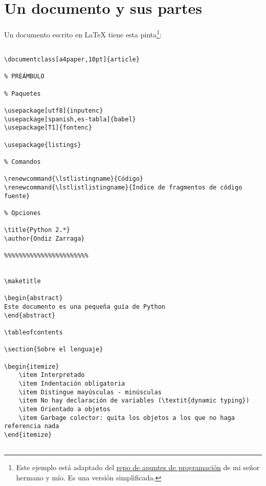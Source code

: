 \section{Un documento y sus partes}\label{un-documento-y-sus-partes}

Un documento escrito en LaTeX tiene esta pinta\footnote{Este ejemplo
  está adaptado del
  \href{https://github.com/ekaitz-zarraga/programming-notes}{repo de
  apuntes de programación} de mi señor hermano y mío. Es una versión
  simplificada.}:

\begin{lstlisting}[language={[latex]tex}, caption={Ejemplo de documento escrito con \LaTeX}]

\documentclass[a4paper,10pt]{article}

% PREÁMBULO 

% Paquetes

\usepackage[utf8]{inputenc}
\usepackage[spanish,es-tabla]{babel}
\usepackage[T1]{fontenc}

\usepackage{listings}

% Comandos

\renewcommand{\lstlistingname}{Código}
\renewcommand{\lstlistlistingname}{Índice de fragmentos de código fuente}

% Opciones

\title{Python 2.*}
\author{Ondiz Zarraga}

%%%%%%%%%%%%%%%%%%%%%%%


\maketitle

\begin{abstract}
Este documento es una pequeña guía de Python 
\end{abstract}

\tableofcontents

\section{Sobre el lenguaje}

\begin{itemize}
    \item Interpretado
    \item Indentación obligatoria
    \item Distingue mayúsculas - minúsculas
    \item No hay declaración de variables (\textit{dynamic typing})
    \item Orientado a objetos  
    \item Garbage colector: quita los objetos a los que no haga referencia nada
\end{itemize}


\end{lstlisting}

